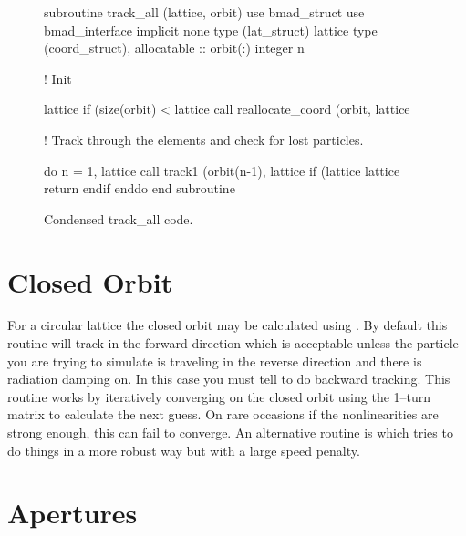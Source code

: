 {{{{{\begin{figure}[htb]
\begin{centering}
\small
\begin{listing}{1}
  subroutine track_all (lattice, orbit)
    use bmad_struct
    use bmad_interface
    implicit none
    type (lat_struct)  lattice
    type (coord_struct), allocatable :: orbit(:)
    integer n

  ! Init

    lattice%
    if (size(orbit) < lattice%
                    call reallocate_coord (orbit, lattice%

  ! Track through the elements and check for lost particles.

    do n = 1, lattice%
      call track1 (orbit(n-1), lattice%
      if (lattice%
        lattice%
        return
      endif
    enddo
  end subroutine
\end{listing}
\caption{Condensed track_all code.}
\end{centering}
\label{f:track_all}
\end{figure}

\section{Closed Orbit}

For a circular lattice the closed orbit may be calculated using
. By default this routine will track in the
forward direction which is acceptable unless the particle you are
trying to simulate is traveling in the reverse direction and there is
radiation damping on. In this case you must tell
 to do backward tracking. This routine works by
iteratively converging on the closed orbit using the 1--turn matrix to
calculate the next guess. On rare occasions if the nonlinearities are
strong enough, this can fail to converge. An alternative routine is
 which tries to do things in a more
robust way but with a large speed penalty.

\section{Apertures}

}}}}}
